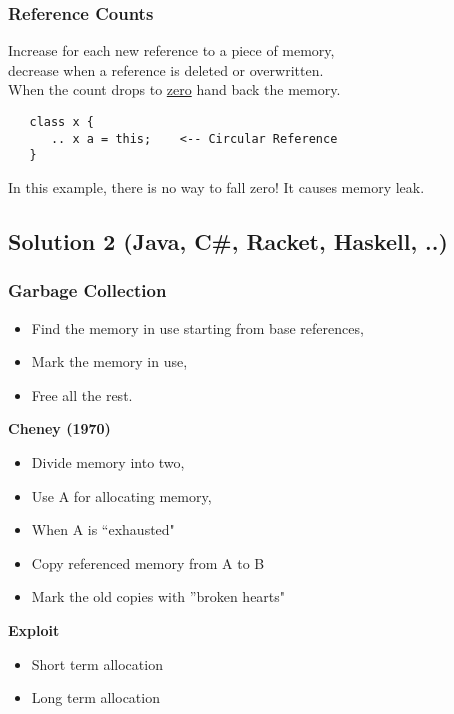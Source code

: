 \documentclass{article}
\begin{document}
\subsubsection*{Reference Counts}
 \begin{flushleft}
  Increase for each new reference to a piece of memory,\\
  decrease when a reference is deleted or overwritten.\\
  When the count drops to \underline{zero} hand back the memory.
  \begin{verbatim}
   class x {
      .. x a = this;    <-- Circular Reference
   }
  \end{verbatim}
  In this example, there is no way to fall zero! It causes memory leak.
 \end{flushleft}
 \pagebreak

\subsection*{Solution 2 (Java, C\#, Racket, Haskell, ..)}
\subsubsection*{Garbage Collection}
\begin{flushleft}
\begin{itemize}
 \item[] Find the memory in use starting from base references,
 \item[] Mark the memory in use,
 \item[] Free all the rest.
\end{itemize}
\bigskip
\textbf{Cheney (1970)}\\
 \begin{itemize}
  \item[] Divide memory into two,
  \item[] Use A for allocating memory,
  \item[] When A is ``exhausted"
  \item[] Copy referenced memory from A to B
  \item[] Mark the old copies with ''broken hearts"
 \end{itemize}
\bigskip
\textbf{Exploit}\\
\begin{itemize}
 \item Short term allocation
 \item Long term allocation
\end{itemize}
\end{flushleft}
\end{document}

